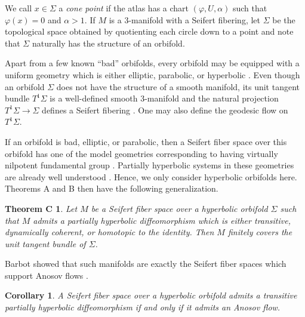 \documentclass[11pt]{amsart} %
\newcommand{\Sig}{\Sigma}
\newcommand{\al}{\alpha}
\newcommand{\UTSig}{T^1 \Sig}
\numberwithin{equation}{section}
\newtheorem{cor}[equation]{Corollary}
\newtheorem*{teoC}{Theorem C}
\theoremstyle{remark}
\begin{document}
We call $x \in \Sig$ a \emph{cone point} if the atlas has a chart
$(\varphi, U, \al)$ such that $\varphi(x) = 0$ and $\al > 1.$
If $M$ is a 3-manifold with a Seifert fibering,
let $\Sig$ be the topological space obtained by quotienting
each circle down to a point and note that $\Sig$
naturally has the structure of an orbifold.

Apart from a few known ``bad'' orbifolds,
%
every orbifold may be equipped with a uniform geometry which is either
elliptic, parabolic, or hyperbolic
\cite[Theorems 2.3 and 2.4]{sco1983geometries}.
Even though an orbifold $\Sig$
does not have the structure of a smooth manifold,
its unit tangent bundle
$\UTSig$ is a well-defined smooth 3-manifold and the natural projection
$\UTSig  \to  \Sig$ defines a Seifert fibering
\cite[\S 5]{ehn1981transverse}.
%
%
%
One may also define the geodesic flow on $\UTSig$.

%
%
If an orbifold is bad, elliptic, or parabolic, then
a Seifert fiber space over this orbifold
has one of the model geometries corresponding to
having virtually nilpotent fundamental group
\cite[Theorem 5.3]{sco1983geometries}.
Partially hyperbolic systems in these geometries are already
well understood
\cite{HPSol}.
Hence, we only consider hyperbolic orbifolds here.
Theorems {A} and {B} then have the following generalization.

\begin{teoC}%
    Let $M$ be a Seifert fiber space over a hyperbolic orbifold $\Sig$
    such that $M$ admits a partially hyperbolic diffeomorphism which is either
    transitive, dynamically coherent, or homotopic to the identity.
    Then $M$ finitely covers the unit tangent bundle of $\Sig$.
\end{teoC}
Barbot showed that such
manifolds are exactly the Seifert fiber spaces which support Anosov flows
\cite{Barbot}.

\begin{cor} \label{cor:seifanosov}
    A Seifert fiber space over a hyperbolic orbifold
    admits a transitive partially hyperbolic diffeomorphism
    if and only if it admits an Anosov flow.
\end{cor}
\end{document}
